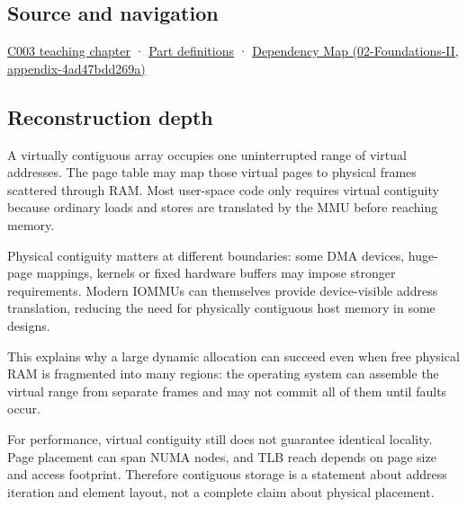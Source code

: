\subsection{Source and navigation}\label{appendix-f897c1ddac8f-source-and-navigation}

\hyperref[01-foundations-i-ch002-where-the-bytes-live]{C003 teaching chapter} · \hyperref[appendix-fd090d982a15-m003---parts-41-60]{Part definitions} · \href{../02-Foundations-II/main.pdf\#nameddest=appendix-4ad47bdd269a}{Dependency Map (02-Foundations-II, appendix-4ad47bdd269a)}

\subsection{Reconstruction depth}\label{appendix-f897c1ddac8f-reconstruction-depth}

A virtually contiguous array occupies one uninterrupted range of virtual addresses. The page table may map those virtual pages to physical frames scattered through RAM. Most user-space code only requires virtual contiguity because ordinary loads and stores are translated by the MMU before reaching memory.

Physical contiguity matters at different boundaries: some DMA devices, huge-page mappings, kernels or fixed hardware buffers may impose stronger requirements. Modern IOMMUs can themselves provide device-visible address translation, reducing the need for physically contiguous host memory in some designs.

This explains why a large dynamic allocation can succeed even when free physical RAM is fragmented into many regions: the operating system can assemble the virtual range from separate frames and may not commit all of them until faults occur.

For performance, virtual contiguity still does not guarantee identical locality. Page placement can span NUMA nodes, and TLB reach depends on page size and access footprint. Therefore contiguous storage is a statement about address iteration and element layout, not a complete claim about physical placement.
